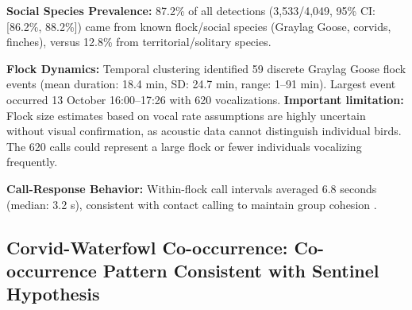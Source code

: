 \documentclass[twocolumn]{article}
\begin{document}
\textbf{Social Species Prevalence:} 87.2\% of all detections (3,533/4,049, 95\% CI: [86.2\%, 88.2\%]) came from known flock/social species (Graylag Goose, corvids, finches), versus 12.8\% from territorial/solitary species.

\textbf{Flock Dynamics:} Temporal clustering identified 59 discrete Graylag Goose flock events (mean duration: 18.4 min, SD: 24.7 min, range: 1--91 min). Largest event occurred 13 October 16:00--17:26 with 620 vocalizations. \textbf{Important limitation:} Flock size estimates based on vocal rate assumptions are highly uncertain without visual confirmation, as acoustic data cannot distinguish individual birds. The 620 calls could represent a large flock or fewer individuals vocalizing frequently.

\textbf{Call-Response Behavior:} Within-flock call intervals averaged 6.8 seconds (median: 3.2 s), consistent with contact calling to maintain group cohesion \citep{Black2019}.

\subsection{Corvid-Waterfowl Co-occurrence: Co-occurrence Pattern Consistent with Sentinel Hypothesis}
\end{document}
